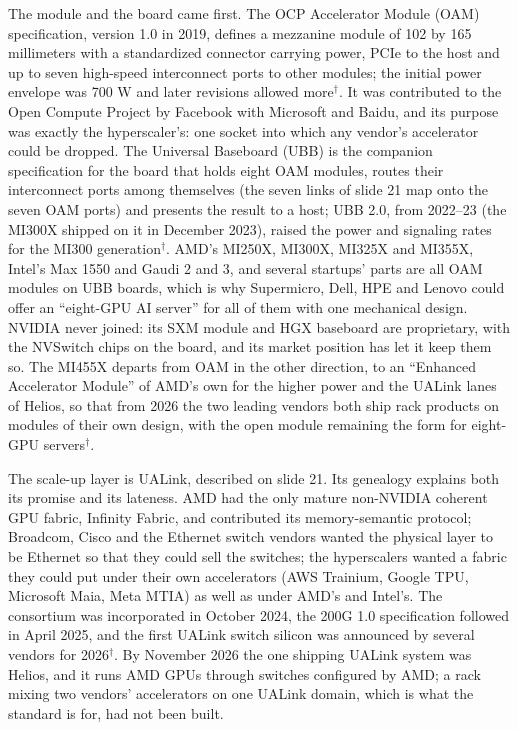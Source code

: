 \documentclass[11pt,letterpaper]{article}
\begin{document}
The module and the board came first. The OCP Accelerator Module (OAM) specification, version 1.0 in 2019, defines a mezzanine module of 102 by 165 millimeters with a standardized connector carrying power, PCIe to the host and up to seven high-speed interconnect ports to other modules; the initial power envelope was 700 W and later revisions allowed more$^\dagger$. It was contributed to the Open Compute Project by Facebook with Microsoft and Baidu, and its purpose was exactly the hyperscaler's: one socket into which any vendor's accelerator could be dropped. The Universal Baseboard (UBB) is the companion specification for the board that holds eight OAM modules, routes their interconnect ports among themselves (the seven links of slide 21 map onto the seven OAM ports) and presents the result to a host; UBB 2.0, from 2022--23 (the MI300X shipped on it in December 2023), raised the power and signaling rates for the MI300 generation$^\dagger$. AMD's MI250X, MI300X, MI325X and MI355X, Intel's Max 1550 and Gaudi 2 and 3, and several startups' parts are all OAM modules on UBB boards, which is why Supermicro, Dell, HPE and Lenovo could offer an ``eight-GPU AI server'' for all of them with one mechanical design. NVIDIA never joined: its SXM module and HGX baseboard are proprietary, with the NVSwitch chips on the board, and its market position has let it keep them so. The MI455X departs from OAM in the other direction, to an ``Enhanced Accelerator Module'' of AMD's own for the higher power and the UALink lanes of Helios, so that from 2026 the two leading vendors both ship rack products on modules of their own design, with the open module remaining the form for eight-GPU servers$^\dagger$.

The scale-up layer is UALink, described on slide 21. Its genealogy explains both its promise and its lateness. AMD had the only mature non-NVIDIA coherent GPU fabric, Infinity Fabric, and contributed its memory-semantic protocol; Broadcom, Cisco and the Ethernet switch vendors wanted the physical layer to be Ethernet so that they could sell the switches; the hyperscalers wanted a fabric they could put under their own accelerators (AWS Trainium, Google TPU, Microsoft Maia, Meta MTIA) as well as under AMD's and Intel's. The consortium was incorporated in October 2024, the 200G 1.0 specification followed in April 2025, and the first UALink switch silicon was announced by several vendors for 2026$^\dagger$. By November 2026 the one shipping UALink system was Helios, and it runs AMD GPUs through switches configured by AMD; a rack mixing two vendors' accelerators on one UALink domain, which is what the standard is for, had not been built.
\end{document}
